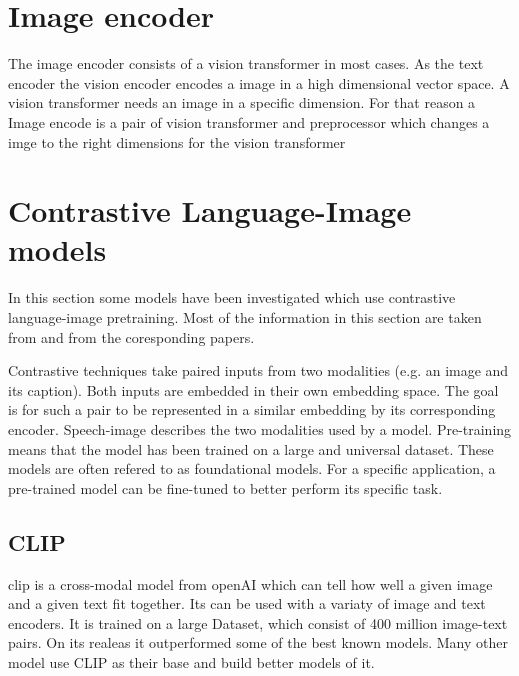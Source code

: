     \section{Image encoder}
    The image encoder consists of a vision transformer\cite{Vis_N_Grams} in most cases.
    As the text encoder the vision encoder encodes a image in a high dimensional vector space.
    A vision transformer needs an image in a specific dimension.
    For that reason a Image encode is a pair of vision transformer and preprocessor which changes a imge to the right dimensions for the vision transformer

    
    \section{Contrastive Language-Image models
        \label{section:languageimagemodels}}
        In this section some models have been investigated which use contrastive language-image pretraining.
        Most of the information in this section are taken from \cite{cliplikeweb} and from the coresponding papers.

        Contrastive techniques take paired inputs from two modalities (e.g. an image and its caption).
        Both inputs are embedded in their own embedding space.
        The goal is for such a pair to be represented in a similar embedding by its corresponding encoder.
        Speech-image describes the two modalities used by a model.
        Pre-training means that the model has been trained on a large and universal dataset.
        These models are often refered to as foundational models.
        For a specific application, a pre-trained model can be fine-tuned to better perform its specific task.

        \subsection{CLIP
            \label{section:clip}}
        \acrfull{clip} \cite{clip} is a cross-modal model from openAI\cite{openai} which can tell how well a given image and a given text fit together.
        Its can be used with a variaty of image and text encoders.
        It is trained on a large Dataset, which consist of 400 million image-text pairs.
        On its realeas it outperformed some of the best known models.
        Many other model use CLIP as their base and build better models of it.

